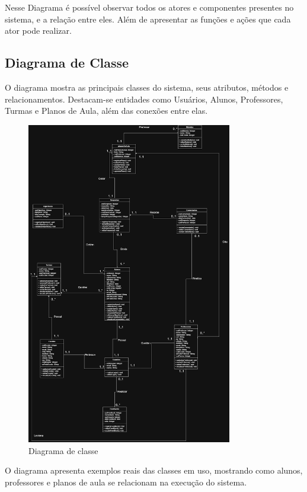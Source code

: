 \documentclass[
  a4paper,
  12pt,
  english,
  brazilian,
]{article}
\begin{document}
Nesse Diagrama é possível observar todos os atores e componentes presentes no sistema, e a relação entre eles. Além de apresentar as funções e ações que cada ator pode realizar.

\subsection*{Diagrama de Classe}

O diagrama mostra as principais classes do sistema, seus atributos, métodos e relacionamentos. Destacam-se entidades como Usuários, Alunos, Professores, Turmas e Planos de Aula, além das conexões entre elas.

\begin{figure}[H]
\centering
\caption{Diagrama de classe}%
\label{fig:diagrama-classe}
\includegraphics[width=0.8\textwidth]{Logos/diagramaclasse.png}
\end{figure}

O diagrama apresenta exemplos reais das classes em uso, mostrando como alunos, professores e planos de aula se relacionam na execução do sistema.
\end{document}
